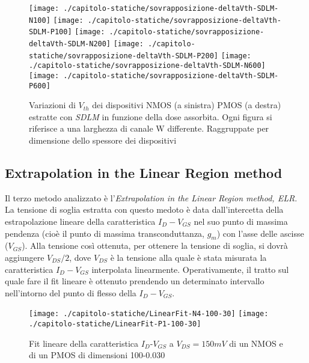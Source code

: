 

\begin{figure}[H]
  \centering
  \texttt{[image: ./capitolo-statiche/sovrapposizione-deltaVth-SDLM-N100]}
  \texttt{[image: ./capitolo-statiche/sovrapposizione-deltaVth-SDLM-P100]}
  \texttt{[image: ./capitolo-statiche/sovrapposizione-deltaVth-SDLM-N200]}
  \texttt{[image: ./capitolo-statiche/sovrapposizione-deltaVth-SDLM-P200]}
  \texttt{[image: ./capitolo-statiche/sovrapposizione-deltaVth-SDLM-N600]}
  \texttt{[image: ./capitolo-statiche/sovrapposizione-deltaVth-SDLM-P600]}
  \caption{Variazioni di $V_{th}$ dei dispositivi NMOS (a sinistra) PMOS (a destra) estratte con \emph{SDLM} in funzione della dose assorbita. Ogni figura si riferisce a una larghezza di canale W differente. Raggruppate per dimensione dello spessore dei dispositivi}
  \label{fig:deltaVthSDLM}
\end{figure}

\subsection[ELR]{Extrapolation in the Linear Region method}
Il terzo metodo analizzato è l'\emph{Extrapolation in the Linear Region method, ELR}\cite{art2}. La tensione di soglia estratta con questo medoto è data dall'intercetta della estrapolazione lineare della caratteristica $I_D-V_{GS}$ nel suo punto di massima pendenza (cioè il punto di massima transconduttanza, $g_m$) con l'asse delle ascisse ($V_{GS}$). Alla tensione così ottenuta, per ottenere la tensione di soglia, si dovrà aggiungere $V_{DS}/2$, dove $V_{DS}$ è la tensione alla quale è stata misurata la caratteristica $I_D-V_{GS}$ interpolata linearmente.
Operativamente, il tratto sul quale fare il fit lineare è ottenuto prendendo un determinato intervallo nell'intorno del punto di flesso della $I_D-V_{GS}$.

\begin{figure}[h!]
  \centering
  \texttt{[image: ./capitolo-statiche/LinearFit-N4-100-30]}
  \texttt{[image: ./capitolo-statiche/LinearFit-P1-100-30]}
  \caption{Fit lineare della caratteristica  $I_D$-$V_{GS}$ a $V_{DS}=150mV$ di un NMOS e di un PMOS di dimensioni 100-0.030 }
\end{figure}

